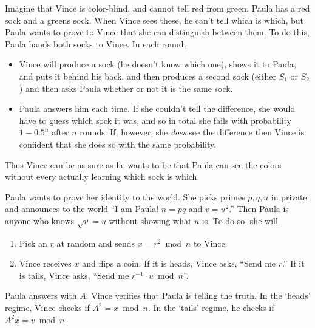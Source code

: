 \begin{example}
Imagine that Vince is color-blind, and cannot tell red from green. Paula has a red sock and a greens sock. When Vince sees these, he can't tell which is which, but Paula wants to prove to Vince that she can distinguish between them. To do this, Paula hands both socks to Vince. In each round, 
\begin{itemize}
\item Vince will produce a sock (he doesn't know which one), shows it to Paula, and puts it behind his back, and then produces a second sock (either $S_1$ or $S_2$) and then asks Paula whether or not it is the same sock. 
\item Paula answers him each time. If she couldn't tell the difference, she would have to guess which sock it was, and so in total she fails with probability $1-0.5^n$ after $n$ rounds. If, however, she \emph{does} see the difference then Vince is confident that she does so with the same probability.
\end{itemize}
Thus Vince can be as sure as he wants to be that Paula can see the colors without every actually learning which sock is which.
\end{example}

\begin{example}
Paula wants to prove her identity to the world. She picks primes $p,q,u$ in private, and announces to the world ``I am Paula! $n=pq$ and $v=u^2$.'' Then Paula is anyone who knows $\sqrt{v} = u$ without showing what $u$ is. To do so, she will
\begin{enumerate}
\item Pick an $r$ at random and sends $x=r^2 \bmod n$ to Vince.
\item Vince receives $x$ and flips a coin. If it is heads, Vince asks, ``Send me $r$.'' If it is tails, Vince asks, ``Send me $r^{-1} \cdot u \bmod n$''.
\end{enumerate}
Paula answers with $A$. Vince verifies that Paula is telling the truth. In the `heads' regime, Vince checks if $A^2 = x \bmod n$. In the `tails' regime, he checks if $A^2x = v \bmod n$.
\end{example}